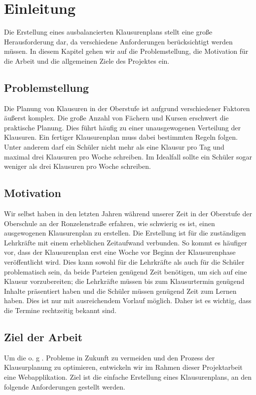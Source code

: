 \newpage
\section{Einleitung}
Die Erstellung eines ausbalancierten Klausurenplans stellt eine große Herausforderung dar, da verschiedene Anforderungen berücksichtigt werden müssen. In diesem Kapitel gehen wir auf die Problemstellung, die Motivation für die Arbeit und die allgemeinen Ziele des Projektes ein.

\subsection{Problemstellung}
Die Planung von Klausuren in der Oberstufe ist aufgrund verschiedener Faktoren äußerst komplex. Die große Anzahl von Fächern und Kursen erschwert die praktische Planung.
Dies führt häufig zu einer unausgewogenen Verteilung der Klausuren. Ein fertiger Klausurenplan muss dabei bestimmten Regeln folgen. Unter anderem darf ein Schüler nicht mehr als eine Klausur pro Tag und maximal drei Klausuren pro Woche schreiben. Im Idealfall sollte ein Schüler sogar weniger als drei Klausuren pro Woche schreiben.

\subsection{Motivation}
Wir selbst haben in den letzten Jahren während unserer Zeit in der Oberstufe der Oberschule an der Ronzelenstraße erfahren, wie schwierig es ist, einen ausgewogenen Klausurenplan zu erstellen. Die Erstellung ist für die zuständigen Lehrkräfte mit einem erheblichen Zeitaufwand verbunden. So kommt es häufiger vor, dass der Klausurenplan erst eine Woche vor Beginn der Klausurenphase veröffentlicht wird. Dies kann sowohl für die Lehrkräfte als auch für die Schüler problematisch sein, da beide Parteien genügend Zeit benötigen, um sich auf eine Klausur vorzubereiten; die Lehrkräfte müssen bis zum Klausurtermin genügend Inhalte präsentiert haben und die Schüler müssen genügend Zeit zum Lernen haben. Dies ist nur mit ausreichendem Vorlauf möglich. Daher ist es wichtig, dass die Termine rechtzeitig bekannt sind.

\subsection{Ziel der Arbeit}
Um die o. g . Probleme in Zukunft zu vermeiden und den Prozess der Klausurplanung zu optimieren, entwickeln wir im Rahmen dieser Projektarbeit eine Webapplikation. Ziel ist die einfache Erstellung eines Klausurenplans, an den folgende Anforderungen gestellt werden.

